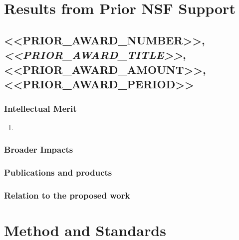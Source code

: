\documentclass[11pt]{amsart}
\theoremstyle{plain}
\theoremstyle{definition}
\numberwithin{equation}{section}
\begin{document}
\section{Results from Prior NSF Support}\label{S:prior}
\subsection*{<<PRIOR_AWARD_NUMBER>>, \emph{<<PRIOR_AWARD_TITLE>>}, <<PRIOR_AWARD_AMOUNT>>, <<PRIOR_AWARD_PERIOD>>}
\subsubsection*{Intellectual Merit}
\begin{enumerate}[leftmargin=*,itemsep=1pt]
\item\label{item:prior-<<PRIOR_ITEM_1_SLUG>>}
\end{enumerate}
\subsubsection*{Broader Impacts}
\subsubsection*{Publications and products}
\subsubsection*{Relation to the proposed work}

\section{Method and Standards}\label{S:method}
\end{document}
